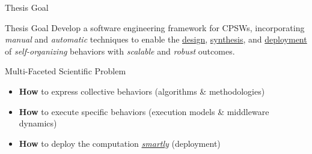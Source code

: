 \documentclass[presentation, 9pt,169]{beamer}\mode<presentation>{\usetheme{AMSBolognaFC}}
\begin{document}
\begin{frame}{Thesis Goal}
  \begin{alertblock}{Thesis Goal}
    Develop a software engineering framework for CPSWs, 
    incorporating \emph{manual} and \emph{automatic} techniques to enable the \underline{design}, \underline{synthesis}, and \underline{deployment} of \emph{self-organizing} behaviors with \emph{scalable} and \emph{robust} outcomes.
  \end{alertblock}

  \begin{exampleblock}{Multi-Faceted Scientific Problem}
    \begin{itemize}
      \item \textbf{How} to express collective behaviors (algorithms \& methodologies)
      \item \textbf{How} to execute specific behaviors (execution models \& middleware dynamics)
      \item \textbf{How} to deploy the computation \emph{\underline{smartly}} (deployment) 
    \end{itemize}
  \end{exampleblock}
\end{frame}
\end{document}

